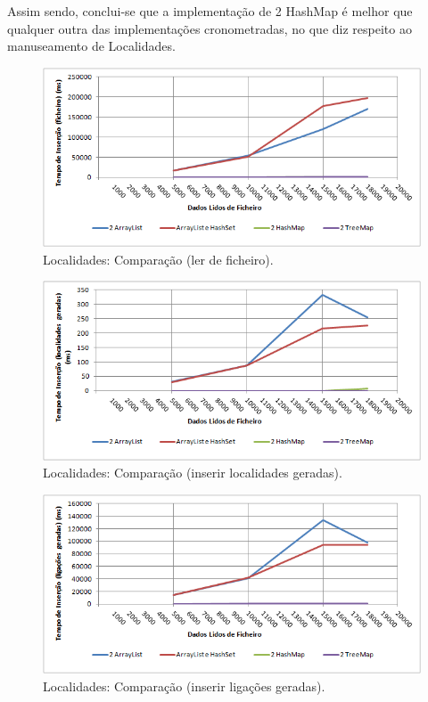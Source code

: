 \documentclass[a5paper,twocolumn, 11pt]{article}
\begin{document}
Assim sendo, conclui-se que a implementação de 2 HashMap é melhor que qualquer outra das implementações cronometradas, no que diz respeito ao manuseamento de Localidades.
\clearpage
\onecolumn
\begin{figure}[h!b!t!]
    \caption[Localidades: Comparação (ler de ficheiro)]{Localidades: Comparação (ler de ficheiro).}
    \label{hashtable}
    \centering
        \includegraphics[width=400pt]{cloc_o1.png}
\end{figure}
\begin{figure}[h!b!t!]
    \caption[Localidades: Comparação (inserir localidades geradas)]{Localidades: Comparação (inserir localidades geradas).}
    \label{hashtable}
    \centering
        \includegraphics[width=400pt]{cloc_o2.png}
\end{figure}
\begin{figure}[h!b!t!]
    \caption[Localidades: Comparação (inserir ligações geradas)]{Localidades: Comparação (inserir ligações geradas).}
    \label{hashtable}
    \centering
        \includegraphics[width=400pt]{cloc_o3.png}
\end{figure}
\end{document}
